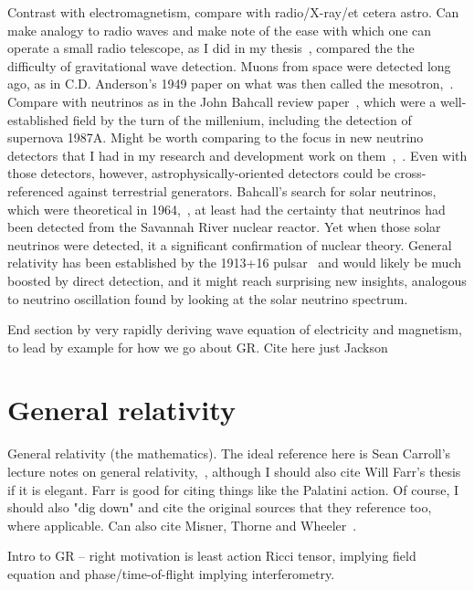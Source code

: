             Contrast with electromagnetism, compare with radio/X-ray/et cetera astro. Can make analogy to radio waves and make note of the ease with which one can operate a small radio telescope, as I did in my thesis~\cite{MeadorsThesis2008}, compared the the difficulty of gravitational wave detection. Muons from space were detected long ago, as in C.D. Anderson's 1949 paper on what was then called the mesotron,~\cite{CDAnderson}. Compare with neutrinos as in the John Bahcall review paper~\cite{NeutrinoReview}, which were a well-established field by the turn of the millenium, including the detection of supernova 1987A. Might be worth comparing to the focus in new neutrino detectors that I had in my research and development work on them~\cite{EBubble2005},~\cite{MeadorsNevis2006}. Even with those detectors, however, astrophysically-oriented detectors could be cross-referenced against terrestrial generators. Bahcall's search for solar neutrinos, which were theoretical in 1964,~\cite{NeutrinosSolarTheoretical}, at least had the certainty that neutrinos had been detected from the Savannah River nuclear reactor. Yet when those solar neutrinos were detected, it a significant confirmation of nuclear theory. General relativity has been established by the 1913+16 pulsar~\cite{WeisbergTaylor2004} and would likely be much boosted by direct detection, and it might reach surprising new insights, analogous to neutrino oscillation found by looking at the solar neutrino spectrum.

    End section by very rapidly deriving wave equation of electricity and magnetism, to lead by example for how we go about GR.
    Cite here just Jackson~\cite{JacksonEM}
        

    \section{General relativity}
    \label{general_relativity}

        General relativity (the mathematics). The ideal reference here is Sean Carroll's lecture notes on general relativity,~\cite{Carroll1997}, although I should also cite Will Farr's thesis~\cite{FarrThesis} if it is elegant. Farr is good for citing things like the Palatini action. Of course, I should also "dig down" and cite the original sources that they reference too, where applicable. Can also cite Misner, Thorne and Wheeler~\cite{MisnerThorneWheeler}.

Intro to GR -- right motivation is least action Ricci tensor, implying field equation and phase/time-of-flight implying interferometry.

